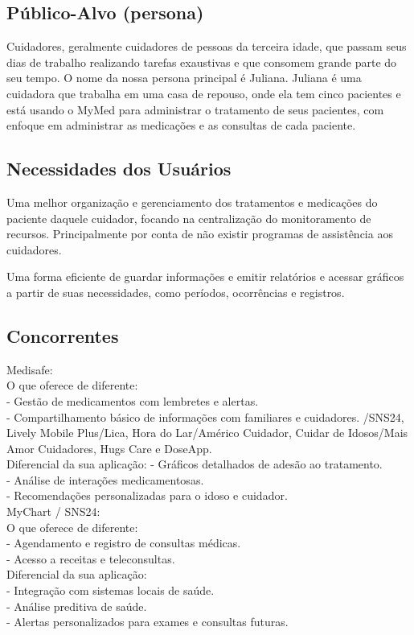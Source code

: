 \subsection*{Público-Alvo (persona)}
Cuidadores, geralmente cuidadores de pessoas da terceira idade, que passam seus dias de trabalho realizando tarefas exaustivas e que consomem grande parte do seu tempo.  O nome da nossa persona principal é Juliana. Juliana é uma cuidadora que trabalha em uma casa de repouso, onde ela tem cinco pacientes e está usando o MyMed para administrar o tratamento de seus pacientes, com enfoque em administrar as medicações e as consultas de cada paciente. 

\subsection*{Necessidades dos Usuários}
Uma melhor organização e gerenciamento dos tratamentos e medicações do paciente daquele cuidador, focando na centralização do monitoramento de recursos. Principalmente por conta de não existir programas de assistência aos cuidadores. 

Uma forma eficiente de guardar informações e emitir relatórios e acessar gráficos a partir de suas necessidades, como períodos, ocorrências e registros.

\subsection*{Concorrentes}
Medisafe:\\
 O que oferece de diferente: \\
- Gestão de medicamentos com lembretes e alertas. \\
- Compartilhamento básico de informações com familiares e cuidadores. /SNS24, Lively Mobile Plus/Lica, Hora do Lar/Américo Cuidador, Cuidar de Idosos/Mais Amor Cuidadores, Hugs Care e DoseApp.\\
 Diferencial da sua aplicação: 
-  Gráficos detalhados de adesão ao tratamento. \\
-  Análise de interações medicamentosas. \\
-  Recomendações personalizadas para o idoso e cuidador.\\

MyChart / SNS24:\\
 O que oferece de diferente: \\
- Agendamento e registro de consultas médicas.  \\
- Acesso a receitas e teleconsultas.\\
 Diferencial da sua aplicação: \\
-  Integração com sistemas locais de saúde.  \\
-  Análise preditiva de saúde.\\
-  Alertas personalizados para exames e consultas futuras. \\

